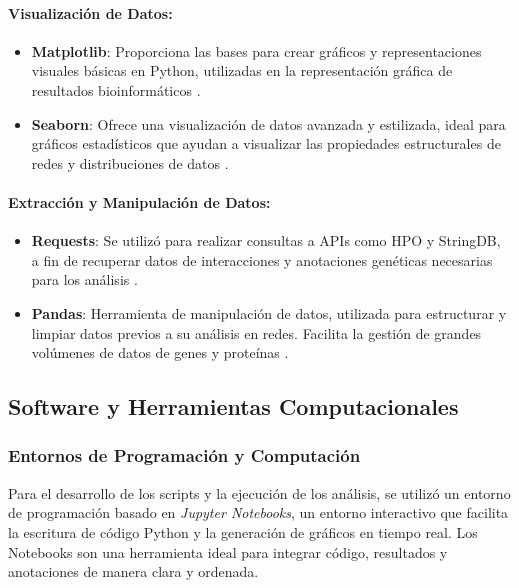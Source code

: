 \paragraph{Visualización de Datos:}
\begin{itemize}
	\item \textbf{Matplotlib}: Proporciona las bases para crear gráficos y representaciones visuales básicas en Python, utilizadas en la representación gráfica de resultados bioinformáticos \cite{Hunter2007}.
	\item \textbf{Seaborn}: Ofrece una visualización de datos avanzada y estilizada, ideal para gráficos estadísticos que ayudan a visualizar las propiedades estructurales de redes y distribuciones de datos \cite{Waskom2021}.
\end{itemize}

\paragraph{Extracción y Manipulación de Datos:}
\begin{itemize}
	\item \textbf{Requests}: Se utilizó para realizar consultas a APIs como HPO y StringDB, a fin de recuperar datos de interacciones y anotaciones genéticas necesarias para los análisis \cite{Requests2020}.
	\item \textbf{Pandas}: Herramienta de manipulación de datos, utilizada para estructurar y limpiar datos previos a su análisis en redes. Facilita la gestión de grandes volúmenes de datos de genes y proteínas \cite{McKinney2010}.
\end{itemize}




\subsection{Software y Herramientas Computacionales}

\subsubsection{Entornos de Programación y Computación}
Para el desarrollo de los scripts y la ejecución de los análisis, se utilizó un entorno de programación basado en \textit{Jupyter Notebooks}, un entorno interactivo que facilita la escritura de código Python y la generación de gráficos en tiempo real. Los Notebooks son una herramienta ideal para integrar código, resultados y anotaciones de manera clara y ordenada.

